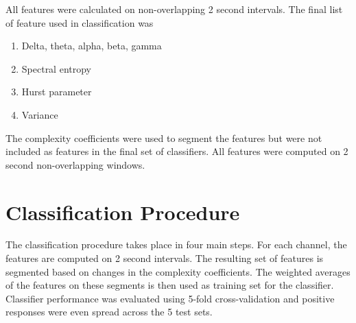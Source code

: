 All features were calculated on non-overlapping 2 second intervals. The final list of feature used in classification was 
\begin{enumerate}
\item Delta, theta, alpha, beta, gamma 
\item Spectral entropy 
\item Hurst parameter
\item Variance
\end{enumerate}

The complexity coefficients were used to segment the features
but were not included as features in the final set of 
classifiers.
All features were computed on 2 second non-overlapping windows.


\section{Classification Procedure}

The classification procedure takes place in four main 
steps.
For each channel, the features are computed on 2 second 
intervals. The resulting set of features is segmented based on changes in the complexity coefficients. 
The weighted averages of the features on these segments is
then used as training set for the classifier. Classifier
performance was evaluated using 5-fold cross-validation
and positive responses were even spread across the 
5 test sets.



